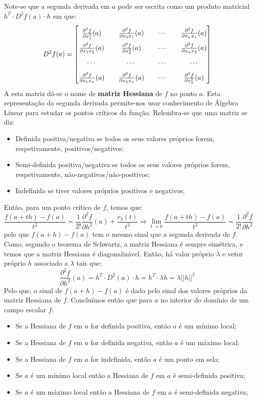 \documentclass{article}
\begin{document}
Note-se que a segunda derivada em $a$ pode ser escrita como um produto matricial $h^T \cdot D^2 f(a) \cdot h$ em que:
$$
D^2 f(a) = 
\renewcommand*{\arraystretch}{1.8}
\begin{bmatrix}
\frac{\partial ^2 f}{\partial x_1 ^2} (a) && \frac{\partial ^2 f}{\partial x_2 x_1} (a) && \cdots && \frac{\partial ^2 f}{\partial x_n x_1} (a) \\
\frac{\partial ^2 f}{\partial x_1 x_2} (a) && \frac{\partial ^2 f}{\partial x_2^2} (a) && \cdots && \frac{\partial ^2 f}{\partial x_n x_2} (a) \\
\cdots && \cdots && \cdots && \cdots \\
\frac{\partial ^2 f}{\partial x_1 x_n} (a) && \frac{\partial ^2 f}{\partial x_2 x_n} (a) && \cdots && \frac{\partial ^2 f}{\partial x_n ^2} (a)
\end{bmatrix}
$$
A esta matriz dá-se o nome de \textbf{matriz Hessiana} de $f$ no ponto $a$. Esta representação da segunda derivada permite-nos usar conhecimento de Álgebra Linear para estudar os pontos críticos da função. Relembra-se que uma matriz se diz:
\begin{itemize}
	\item Definida positiva/negativa se todos os seus valores próprios forem, respetivamente, positivos/negativos;
	\item Semi-definida positiva/negativa se todos os seus valores próprios forem, respetivamente, não-negativos/não-positivos;
	\item Indefinida se tiver valores próprios positivos e negativos;
\end{itemize}
Então, para um ponto crítico de $f$, temos que:
$$
\frac{f(a+th)-f(a)}{t^2} = \frac{1}{2!}\frac{\partial ^2 f}{\partial h^2}(a) + \frac{r_3(t)}{t^2} \Rightarrow \lim_{t \to 0} \frac{f(a+th)-f(a)}{t^2} = \frac{1}{2!} \frac{\partial ^2 f}{\partial h^2}
$$
pelo que $f(a+h)-f(a)$ tem o mesmo sinal que a segunda derivada de $f$. Como, segundo o teorema de Schwartz, a matriz Hessiana é sempre simétrica, e temos que a matriz Hessiana é diagonalizável. Então, há valor próprio $\lambda$ e vetor próprio $h$ associado a $\lambda$ tais que:
$$
\frac{\partial ^2 f}{\partial h^2}(a) = h^T \cdot D^2 (a) \cdot h = h^T \cdot \lambda h = \lambda ||h||^2
$$
Pelo que, o sinal de $f(a+h)-f(a)$ é dado pelo sinal dos valores próprios da matriz Hessiana de $f$. Concluímos então que para $a$ no interior do domínio de um campo escalar $f$:
\begin{itemize}
	\item Se a Hessiana de $f$ em $a$ for definida positiva, então $a$ é um mínimo local;
	\item Se a Hessiana de $f$ em $a$ for definida negativa, então $a$ é um máximo local;
	\item Se a Hessiana de $f$ em $a$ for indefinida, então $a$ é um ponto em sela;
	\item Se $a$ é um mínimo local então a Hessiana de $f$ em $a$ é semi-definida positiva;
	\item Se $a$ é um máximo local então a Hessiana de $f$ em $a$ é semi-definida negativa;
\end{itemize}
\end{document}
